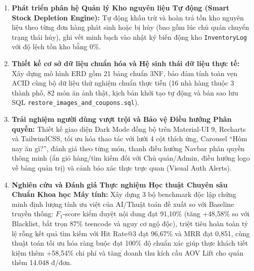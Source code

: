 \documentclass{uetgraduation}
\begin{document}
\begin{enumerate}
    \item \textbf{Phát triển phân hệ Quản lý Kho nguyên liệu Tự động (Smart Stock Depletion Engine):} Tự động khấu trừ và hoàn trả tồn kho nguyên liệu theo từng đơn hàng phát sinh hoặc bị hủy (bao gồm lúc chủ quán chuyển trạng thái hủy), ghi vết minh bạch vào nhật ký biến động kho \texttt{InventoryLog} với độ lệch tồn kho bằng 0\%.
    \item \textbf{Thiết kế cơ sở dữ liệu chuẩn hóa và Hệ sinh thái dữ liệu thực tế:} Xây dựng mô hình ERD gồm 21 bảng chuẩn 3NF, bảo đảm tính toàn vẹn ACID cùng bộ dữ liệu thử nghiệm chuẩn thực tiễn (16 nhà hàng thuộc 3 thành phố, 82 món ăn ảnh thật, kịch bản khởi tạo tự động và bản sao lưu SQL \texttt{restore\_images\_and\_coupons.sql}).
    \item \textbf{Trải nghiệm người dùng vượt trội và Bảo vệ Điều hướng Phân quyền:} Thiết kế giao diện Dark Mode đồng bộ trên Material-UI 9, Recharts và TailwindCSS, tối ưu hóa thao tác với lưới 4 cột thích ứng, Carousel ``Hôm nay ăn gì?'', đánh giá theo từng món, thanh điều hướng Navbar phân quyền thông minh (ẩn giỏ hàng/tìm kiếm đối với Chủ quán/Admin, điều hướng logo về bảng quản trị) và cảnh báo xác thực trực quan (Visual Auth Alerts).
    \item \textbf{Nghiên cứu và Đánh giá Thực nghiệm Học thuật Chuyên sâu Chuẩn Khoa học Máy tính:} Xây dựng 3 bộ benchmark độc lập chứng minh định lượng tính ưu việt của AI/Thuật toán đề xuất so với Baseline truyền thống: $F_1$-score kiểm duyệt nội dung đạt 91,10\% (tăng +48,58\% so với Blacklist, bắt trọn 87\% teencode và nguy cơ ngộ độc), triệt tiêu hoàn toàn tỷ lệ rỗng kết quả tìm kiếm với Hit Rate@3 đạt 96,67\% và MRR đạt 0,851, cùng thuật toán tối ưu hóa ràng buộc đạt 100\% độ chuẩn xác giúp thực khách tiết kiệm thêm +58,54\% chi phí và tăng doanh thu kích cầu AOV Lift cho quán thêm 14.048 đ/đơn.
\end{enumerate}
\end{document}
